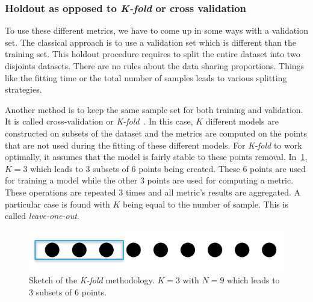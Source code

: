 \subsubsection{Holdout as opposed to \emph{K-fold} or cross validation}
To use these different metrics, we have to come up in some ways with a validation set. The classical approach is to use a validation set which is different than the training set. This holdout procedure requires to split the entire dataset into two disjoints datasets. There are no rules about the data sharing proportions. Things like the fitting time or the total number of samples leads to various splitting strategies.

Another method is to keep the same sample set for both training and validation. It is called cross-validation or \emph{K-fold}~\cite{kohavi1995}. In this case, $K$ different models are constructed on subsets of the dataset and the metrics are computed on the points that are not used during the fitting of these different models. For \emph{K-fold} to work optimally, it assumes that the model is fairly stable to these points removal. In~\cref{fig:k_fold}, $K=3$ which leads to 3 subsets of 6 points being created. These 6 points are used for training a model while the other 3 points are used for computing a metric. These operations are repeated 3 times and all metric's results are aggregated. A particular case is found with $K$ being equal to the number of sample. This is called \emph{leave-one-out}.

\begin{figure}[H]
\centering
\includegraphics[width=0.6\linewidth,keepaspectratio]{fig/literature/k_fold.png}
\caption{Sketch of the \emph{K-fold} methodology. $K=3$ with $N=9$ which leads to 3 subsets of 6 points.}
\label{fig:k_fold}
\end{figure}


